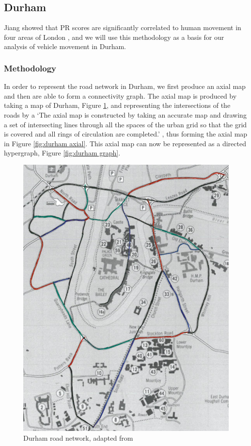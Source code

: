 \documentclass[11pt]{report}
\begin{document}
{\subsection{Durham} \label{sec:durham}
Jiang showed that PR scores are significantly correlated to human movement in four areas of London \cite{doi:10.1080/13658810802022822}, and we will use this methodology as a basis for our analysis of vehicle movement in Durham. 
\subsubsection{Methodology}
In order to represent the road network in Durham, we first produce an axial map and then are able to form a connectivity graph. The axial map is produced by taking a map of Durham, Figure \ref{fig:durham map}, and representing the intersections of the roads by a `The axial map is constructed by taking an accurate map and drawing a set of intersecting lines through all the spaces of the urban grid so that the grid is covered and all rings of circulation are completed.' \cite{Axialmap40:online}, thus forming the axial map in Figure \ref{fig:durham axial}. This axial map can now be represented as a directed hypergraph, Figure \ref{fig:durham graph}. 

\begin{figure}[h]
\centering
\includegraphics[width=\linewidth]{durham_with_colour.jpg}
\caption{Durham road network, adapted from \cite{undergraduate}}
\label{fig:durham map}
\end{figure}

}
\end{document}
